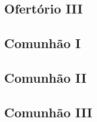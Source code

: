 \AllowPageFlush

\subsection{Ofertório III}\label{subsection:liturgia-defunctorum/missa-pro-defunctis/offertorium-3}

\AllowPageFlush

\subsection{Comunhão I}\label{subsection:liturgia-defunctorum/missa-pro-defunctis/communio-1}

\subsection{Comunhão II}\label{subsection:liturgia-defunctorum/missa-pro-defunctis/communio-2}

\AllowPageBreak

\subsection{Comunhão III}\label{subsection:liturgia-defunctorum/missa-pro-defunctis/communio-3}

